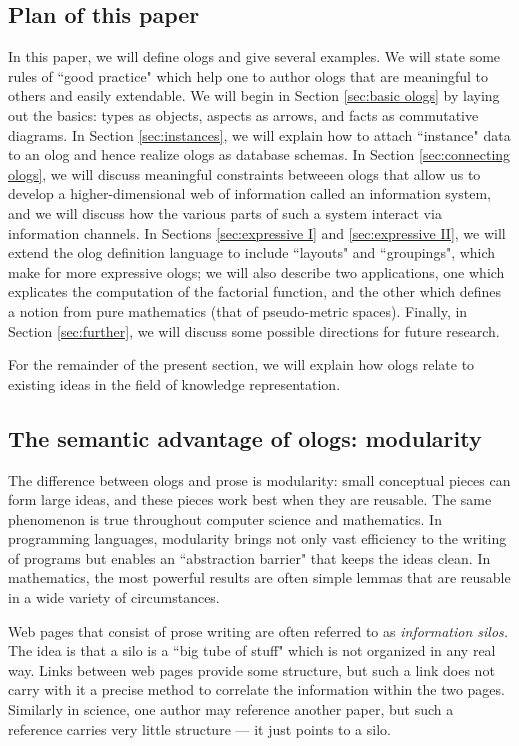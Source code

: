 \subsection{Plan of this paper}

In this paper, we will define ologs and give several examples. We will state some rules of ``good practice" which help one to author ologs that are meaningful to others and easily extendable. We will begin in Section \ref{sec:basic ologs} by laying out the basics: types as objects, aspects as arrows, and facts as commutative diagrams. In Section \ref{sec:instances}, we will explain how to attach ``instance" data to an olog and hence realize ologs as database schemas. In Section \ref{sec:connecting ologs}, we will discuss meaningful constraints betweeen ologs that allow us to develop a higher-dimensional web of information called an information system, and we will discuss how the various parts of such a system interact via information channels. In Sections \ref{sec:expressive I} and \ref{sec:expressive II}, we will extend the olog definition language to include ``layouts" and ``groupings", which make for more expressive ologs; we will also describe two applications, one which explicates the computation of the factorial function, and the other which defines a notion from pure mathematics (that of pseudo-metric spaces). Finally, in Section \ref{sec:further}, we will discuss some possible directions for future research.

For the remainder of the present section, we will explain how ologs relate to existing ideas in the field of knowledge representation.

\subsection{The semantic advantage of ologs: modularity}

The difference between ologs and prose is modularity: small conceptual pieces can form large ideas, and these pieces work best when they are reusable. The same phenomenon is true throughout computer science and mathematics. In programming languages, modularity brings not only vast efficiency to the writing of programs but enables an ``abstraction barrier" that keeps the ideas clean. In mathematics, the most powerful results are often simple lemmas that are reusable in a wide variety of circumstances. 

Web pages that consist of prose writing are often referred to as {\em information silos.}  The idea is that a silo is a ``big tube of stuff" which is not organized in any real way. Links between web pages provide some structure, but such a link does not carry with it a precise method to correlate the information within the two pages. Similarly in science, one author may reference another paper, but such a reference carries very little structure --- it just points to a silo.   

